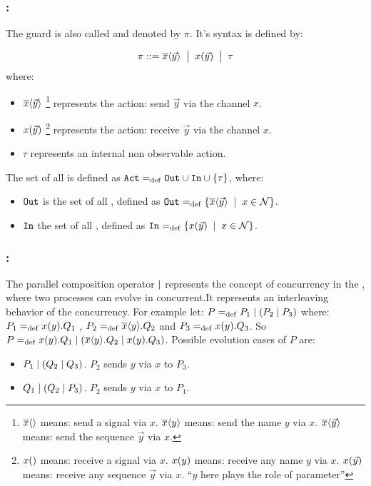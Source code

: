 \subsubsection{:} The guard is also called  and denoted by $\pi$. It's syntax is defined by:
\begin{definition}
\label{def_prefix_syntax}
\begin{align*}
 \pi ::= \overline{x}\langle\vec{y}\rangle \;\bigm|\; x(\vec{y}) \;\bigm|\; \tau
\end{align*}
where:
\begin{itemize}
\item $\overline{x}\langle\vec{y}\rangle$ \footnote{$\overline{x}\langle{}\rangle$ means: send a signal via $x$. $\overline{x}\langle{y}\rangle$ means: send the name $y$ via $x$.  $\overline{x}\langle{\vec{y}}\rangle$ means: send the sequence $\vec{y}$ via $x$.} represents the action: send $\vec{y}$ via the channel $x$.
\item $x(\vec{y})$ \footnote{$x({})$ means: receive a signal via $x$. $x({y})$ means: receive any name $y$ via $x$.  $x({\vec{y}})$ means: receive any sequence $\vec{y}$ via $x$. ``$y$ here plays the role of parameter''} represents the action: receive $\vec{y}$ via the channel $x$.
\item $\tau$ represents an internal non observable action.
\end{itemize}
\end{definition}
The set of all  is defined as $\actions\define\outA\cup\inA\cup\set{\tau}$, where:
\begin{itemize}
\item $\mathtt{Out}$ is the set of all , defined as $\outA\define\set[x\in\names]{\out{x}{\vec{y}}}$.
\item $\mathtt{In}$ the set of all , defined as $\inA\define\set[x\in\names]{\inp{x}{\vec{y}}}$.
\end{itemize}
\subsubsection{:}
The parallel composition operator $\mid$ represents the concept of concurrency in the \picalc{}, where two processes can evolve in concurrent.It represents an interleaving behavior of the concurrency.
For example let:  $P=_{\mathrm{def}}P_1 \mid (P_2 \mid P_3)$ where: $P_1=_{\mathrm{def}}x(y).Q_1$ , $P_2=_{\mathrm{def}}\overline{x}\langle y\rangle.Q_2$ and $P_3=_{\mathrm{def}}x(y).Q_3$. So $P=_{\mathrm{def}}x(y).Q_1 \mid (\overline{x}\langle y\rangle.Q_2 \mid x(y).Q_3)$.
Possible evolution cases of $P$ are:
\begin{itemize}
\item $P_1 \mid (Q_2 \mid Q_3)$. $P_2$ sends $y$ via $x$ to $P_3$.
\item $Q_1 \mid (Q_2 \mid P_3)$. $P_2$ sends $y$ via $x$ to $P_1$.
\end{itemize}

